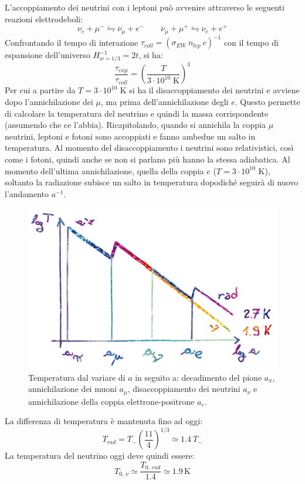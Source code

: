 L'accoppiamento dei neutrini con i leptoni può avvenire attraverso le seguenti reazioni elettrodeboli:
$$
\nu_e + \mu^- \leftrightharpoons {\overbar{\nu}_\mu} + e^- \qquad {\overbar{\nu}_\mu} + \mu^+ \leftrightharpoons \nu_e + e^+ 
$$
Confrontando il tempo di interazione $\tau_{coll}=(\sigma_{EW}~n_{lep}~c)^{-1}$ con il tempo di espansione dell'universo $H^{-1}_{w=1/3} = 2t$, si ha: 
\begin{equation}
    \frac{\tau_{exp}}{\tau_{coll}}= \left (\frac{T}{3\cdot 10^{10}\;\mathrm{K}}\right)^3
\end{equation}
Per cui a partire da $T= 3\cdot 10^{10}$ K si ha il disaccoppiamento dei neutrini e avviene dopo l'annichilazione dei $\mu$, ma prima dell'annichilazione degli $e$. Questo permette di calcolare la temperatura del neutrino e quindi la massa corrispondente (assumendo che ce l'abbia). 
Ricapitolando, quando si annichila la coppia $\mu$ neutrini, leptoni e fotoni sono accoppiati e fanno ambedue un salto in temperatura. Al momento del disaccoppiamento i neutrini sono relativistici, così come i fotoni, quindi anche se non si parlano più hanno la stessa adiabatica. Al momento dell'ultima annichilazione, quella della coppia $e$ ($T=3\cdot 10^{10}$ K), soltanto la radiazione subisce un salto in temperatura dopodiché seguirà di nuovo l'andamento $a^{-1}$. 

\begin{figure}[h]
    \centering
    \includegraphics[width=.8 \textwidth]{Pictures/5/annichilazioni.png}
    \caption{Temperatura dal variare di $a$ in seguito a: decadimento del pione $a_\pi$, annichilazione dei muoni $a_\mu$, disaccoppiamento dei neutrini $a_\nu$ e annichilazione della coppia elettrone-positrone $a_e$.}
\end{figure}


La differenza di temperatura è mantenuta fino ad oggi:
$$
T_{rad} = T_- \left(\frac{11}{4} \right)^{1/3}\simeq 1.4 ~T_-
$$
La temperatura del neutrino oggi deve quindi essere:
$$
T_{0,\, \nu} \simeq \frac{T_{0,\, rad}}{1.4} \simeq 1.9 \, \mathrm{K}
$$

